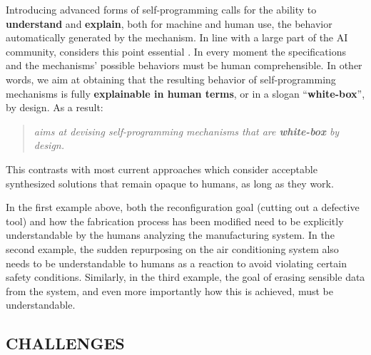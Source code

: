 Introducing advanced forms of self-programming calls for the ability to
\textbf{understand} and \textbf{explain}, both for machine and human
use, the behavior automatically generated by the mechanism.
In line with a large part of the AI community, 
\project considers this point essential \autocite[]{RussellDT15}.
In every moment the specifications and the mechanisms' possible
behaviors must be human comprehensible. In other words, we aim at
obtaining that the resulting behavior of self-programming mechanisms
is fully \textbf{explainable in human terms}, or in a slogan
``\textbf{white-box}'', by design. As a result:

\begin{quote}
\textit{
\project aims at devising self-programming mechanisms that are \textbf{white-box} by design.}
\end{quote}

This contrasts with most current approaches which consider  acceptable synthesized solutions that  remain opaque to humans, as long as they work.

In the first example above, both  the reconfiguration goal
(cutting out a defective tool) and how the fabrication process has
been modified need to be explicitly understandable by the humans analyzing
the manufacturing system.
In the second example, the sudden repurposing on the air conditioning system
also needs to be understandable to humans as a reaction to avoid
violating certain safety conditions.
Similarly, in the third example, the goal of erasing sensible data
from the system, and even more importantly how
this is achieved, must be understandable.


\subsection*{CHALLENGES}


